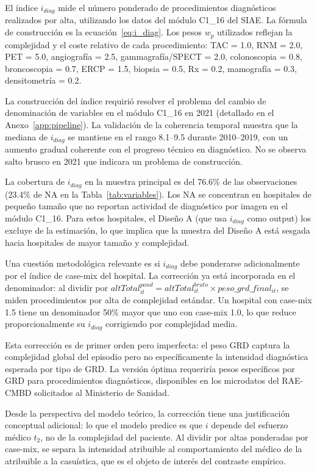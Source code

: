 El índice $i_{diag}$ mide el número ponderado de procedimientos diagnósticos realizados por alta, utilizando los datos del módulo C1\_16 del SIAE. La fórmula de construcción es la ecuación~\eqref{eq:i_diag}. Los pesos $w_p$ utilizados reflejan la complejidad y el coste relativo de cada procedimiento: TAC = 1.0, RNM = 2.0, PET = 5.0, angiografía = 2.5, gammagrafía/SPECT = 2.0, colonoscopia = 0.8, broncoscopia = 0.7, ERCP = 1.5, biopsia = 0.5, Rx = 0.2, mamografía = 0.3, densitometría = 0.2.

La construcción del índice requirió resolver el problema del cambio de denominación de variables en el módulo C1\_16 en 2021 (detallado en el Anexo~\ref{app:pipeline}). La validación de la coherencia temporal muestra que la mediana de $i_{diag}$ se mantiene en el rango 8.1--9.5 durante 2010--2019, con un aumento gradual coherente con el progreso técnico en diagnóstico. No se observa salto brusco en 2021 que indicara un problema de construcción.

La cobertura de $i_{diag}$ en la muestra principal es del 76.6\% de las observaciones (23.4\% de NA en la Tabla~\ref{tab:variables}). Los NA se concentran en hospitales de pequeño tamaño que no reportan actividad de diagnóstico por imagen en el módulo C1\_16. Para estos hospitales, el Diseño A (que usa $i_{diag}$ como output) los excluye de la estimación, lo que implica que la muestra del Diseño A está sesgada hacia hospitales de mayor tamaño y complejidad.

\begin{remark}
\label{rem:casemix_intensidad}
Una cuestión metodológica relevante es si $i_{diag}$ debe ponderarse adicionalmente por el índice de case-mix del hospital. La corrección ya está incorporada en el denominador: al dividir por $altTotal^{pond}_{it} = altTotal^{bruto}_{it}\times peso\_grd\_final_{it}$, se miden procedimientos por alta de complejidad estándar. Un hospital con case-mix 1.5 tiene un denominador 50\% mayor que uno con case-mix 1.0, lo que reduce proporcionalmente su $i_{diag}$ corrigiendo por complejidad media.

Esta corrección es de primer orden pero imperfecta: el peso GRD captura la complejidad global del episodio pero no específicamente la intensidad diagnóstica esperada por tipo de GRD. La versión óptima requeriría pesos específicos por GRD para procedimientos diagnósticos, disponibles en los microdatos del RAE-CMBD solicitados al Ministerio de Sanidad.

Desde la perspectiva del modelo teórico, la corrección tiene una justificación conceptual adicional: lo que el modelo predice es que $i$ depende del esfuerzo médico $t_2$, no de la complejidad del paciente. Al dividir por altas ponderadas por case-mix, se separa la intensidad atribuible al comportamiento del médico de la atribuible a la casuística, que es el objeto de interés del contraste empírico.
\end{remark}

